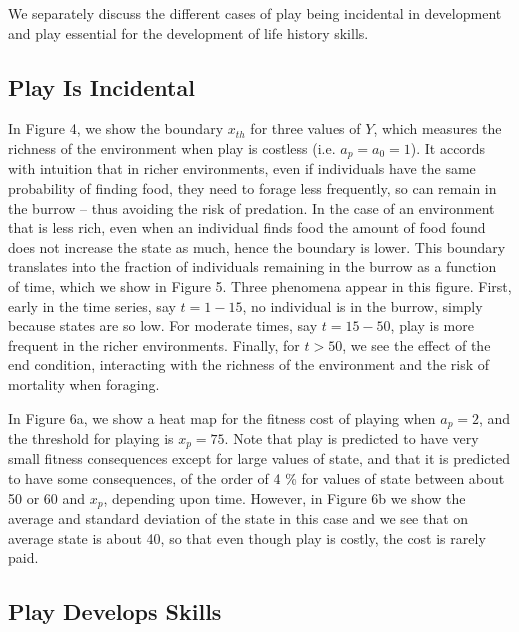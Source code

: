 \documentclass[12pt, letterpaper, fleqn]{article}
\begin{document}
%
We separately discuss the different cases of play being incidental in development and play essential for the development of life history skills.

	\subsection*{Play Is Incidental}
	
	In Figure 4, we show the boundary $x_{th}$ for three values of $Y$, which measures the richness of the environment when play is costless (i.e. $a_p=a_0=1$). 
	It accords with intuition that in richer environments, even if individuals have the same probability of finding food, they need to forage less frequently, so can remain in the burrow -- thus avoiding the risk of predation.  
	In the case of an environment that is less rich, even when an individual finds food the amount of food found does not increase the state as much, hence the boundary is lower.  
	This boundary translates into the fraction of individuals remaining in the burrow as a function of time, which we show in Figure 5.  
	Three phenomena appear in this figure. 
	First, early in the time series, say $t=1-15$, no individual is in the burrow, simply because states are so low.  
	For moderate times, say $t=15-50$, play is more frequent in the richer environments.  
	Finally, for $t>50$, we see the effect of the end condition, interacting with the richness of the environment and the risk of mortality when foraging.
	
	
	In Figure 6a, we show a heat map for the fitness cost of playing when $a_p=2$, and the threshold for playing is $x_p=75$. 
	Note that play is predicted to have very small fitness consequences except for large values of state, and that it is predicted to have some consequences, of the order of 4 \% for values of state between about 50 or 60 and $x_p$, depending upon time.  
	However, in Figure 6b we show the average and standard deviation of the state in this case and we see that on average state is about 40, so that even though play is costly, the cost is rarely paid.
	
	\subsection*{Play Develops Skills}
\end{document}
